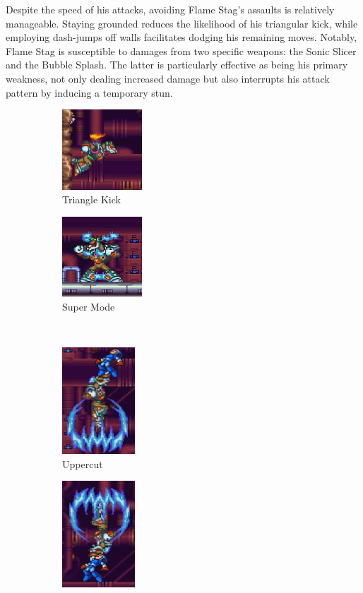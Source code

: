 Despite the speed of his attacks, avoiding Flame Stag's assaults is relatively manageable. Staying grounded reduces the likelihood of his triangular kick, while employing dash-jumps off walls facilitates dodging his remaining moves. Notably, Flame Stag is susceptible to damages from two specific weapons: the Sonic Slicer and the Bubble Splash. The latter is particularly effective as being his primary weakness, not only dealing increased damage but also interrupts his attack pattern by inducing a temporary stun. 
\begin{figure}
	\ContinuedFloat
	\centering
	\begin{subfigure}{0.3\linewidth}
		\centering
		\includegraphics[height=3cm]{figures/X2/Flame_stag/Stag_triangle.png}
		\caption{Triangle Kick}
	\end{subfigure}
	\begin{subfigure}{0.3\linewidth}
		\centering
		\includegraphics[height=3cm]{figures/X2/Flame_stag/Stag_phase_2.png}
		\caption{Super Mode}
	\end{subfigure}\\
	\begin{subfigure}{0.25\linewidth}
		\centering
		\includegraphics[height=4cm]{figures/X2/Flame_stag/Stag_uppercut.png}
		\caption{Uppercut}
	\end{subfigure}
	\begin{subfigure}{0.25\linewidth}
		\centering
		\includegraphics[height=4cm]{figures/X2/Flame_stag/Stag_descend.png}

\end{subfigure}
\end{figure}
